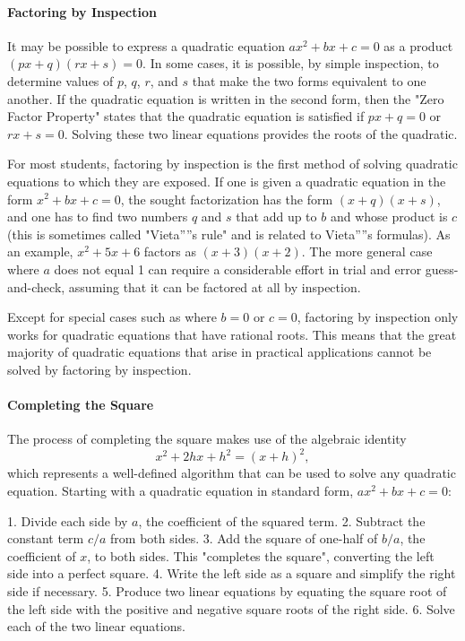 \paragraph{Factoring by Inspection}

It may be possible to express a quadratic equation $ax^2 + bx + c = 0$ as a product $(px + q)(rx + s) = 0$. In some cases, it is possible, by simple inspection, to determine values of $p$, $q$, $r$, and $s$ that make the two forms equivalent to one another. If the quadratic equation is written in the second form, then the "Zero Factor Property" states that the quadratic equation is satisfied if $px + q = 0$ or $rx + s = 0$. Solving these two linear equations provides the roots of the quadratic.

For most students, factoring by inspection is the first method of solving quadratic equations to which they are exposed. If one is given a quadratic equation in the form $x^2 + bx + c = 0$, the sought factorization has the form $(x + q)(x + s)$, and one has to find two numbers $q$ and $s$ that add up to $b$ and whose product is $c$ (this is sometimes called "Vieta''''s rule" and is related to Vieta''''s formulas). As an example, $x^2 + 5x + 6$ factors as $(x + 3)(x + 2)$. The more general case where $a$ does not equal 1 can require a considerable effort in trial and error guess-and-check, assuming that it can be factored at all by inspection.

Except for special cases such as where $b = 0$ or $c = 0$, factoring by inspection only works for quadratic equations that have rational roots. This means that the great majority of quadratic equations that arise in practical applications cannot be solved by factoring by inspection.

\paragraph{Completing the Square}

The process of completing the square makes use of the algebraic identity
$$
x^2 + 2hx + h^2 = (x + h)^2,
$$
which represents a well-defined algorithm that can be used to solve any quadratic equation. Starting with a quadratic equation in standard form, $ax^2 + bx + c = 0$:

1. Divide each side by $a$, the coefficient of the squared term.
2. Subtract the constant term $c/a$ from both sides.
3. Add the square of one-half of $b/a$, the coefficient of $x$, to both sides. This "completes the square", converting the left side into a perfect square.
4. Write the left side as a square and simplify the right side if necessary.
5. Produce two linear equations by equating the square root of the left side with the positive and negative square roots of the right side.
6. Solve each of the two linear equations.

